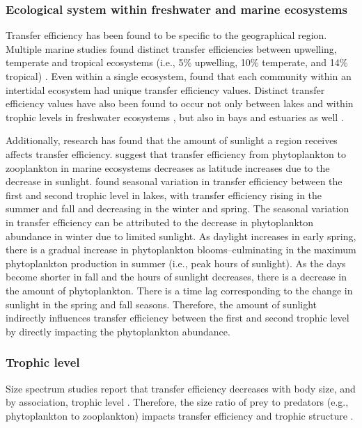 \documentclass[oneside,12pt,final]{sty/ucthesis-CA2012}
\let\cite\citep                             %
\begin{document}
\begin{mainmatter}
\subsubsection*{Ecological system within freshwater and marine ecosystems}
Transfer efficiency has been found to be specific to the geographical region. Multiple marine studies found distinct transfer efficiencies between upwelling, temperate and tropical ecosystems (i.e., 5\% upwelling, 10\% temperate, and 14\% tropical) \cite{libralato2008novel, coll2008ecosystem, chassot2010global}. Even within a single ecosystem,
\citet{baird2004energy} found that each community within an intertidal ecosystem had unique transfer efficiency values. Distinct transfer efficiency values have also been found to occur not only between lakes and within trophic levels in freshwater ecosystems \cite{lindeman1942trophic}, but also in bays and estuaries as well \cite{rybarczyk2003analysis}.

\vspace{5mm}

Additionally, research has found that the amount of sunlight a region receives affects transfer efficiency. \citet{sanmartin2006latitudinal} suggest that transfer efficiency from phytoplankton to zooplankton in marine ecosystems decreases as latitude increases due to the decrease in sunlight. \citet{gaedke1994seasonal} found seasonal variation in transfer efficiency between the first and second trophic level in lakes, with transfer efficiency rising in the summer and fall and decreasing in the winter and spring. The seasonal variation in transfer efficiency can be attributed to the decrease in phytoplankton abundance in winter due to limited sunlight. As daylight increases in early spring, there is a gradual increase in phytoplankton blooms--culminating in the maximum phytoplankton production in summer (i.e., peak hours of sunlight).  As the days become shorter in fall and the hours of sunlight decreases, there is a decrease in the amount of phytoplankton. There is a time lag corresponding to the change in sunlight in the spring and fall seasons. Therefore, the amount of sunlight indirectly influences transfer efficiency between the first and second trophic level by directly impacting the phytoplankton abundance. 

\subsubsection*{Trophic level}
Size spectrum studies report that transfer efficiency decreases with body size, and by association, trophic level \cite{barnes2010global}. Therefore, the size ratio of prey to predators (e.g., phytoplankton to zooplankton) impacts transfer efficiency and trophic structure 
\cite{havens1998size, garciacomas2016prey}.


\end{mainmatter}
\end{document}

